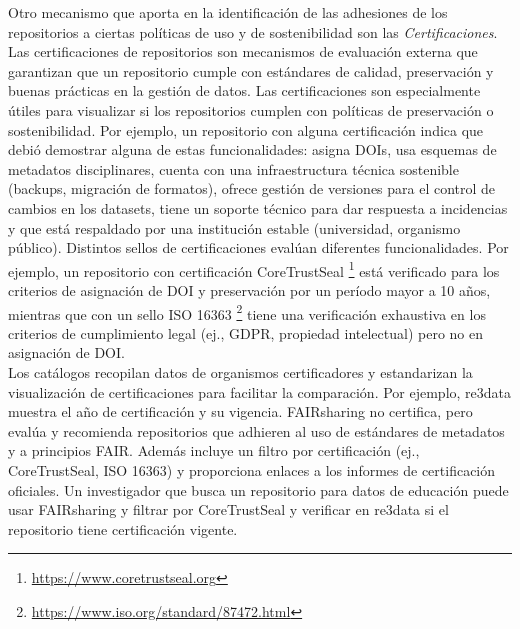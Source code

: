 \documentclass[runningheads]{llncs}
\begin{document}
Otro mecanismo que aporta en la identificación de las adhesiones de los repositorios a ciertas políticas de uso y de sostenibilidad son las \emph{Certificaciones}. Las certificaciones de repositorios son mecanismos de evaluación externa que garantizan que un repositorio cumple con estándares de calidad, preservación y buenas prácticas en la gestión de datos. Las certificaciones son especialmente útiles para visualizar si los repositorios cumplen con políticas de preservación o sostenibilidad. Por ejemplo, un repositorio con alguna certificación indica que debió demostrar alguna de estas funcionalidades: asigna DOIs, usa esquemas de metadatos disciplinares,  cuenta con una infraestructura técnica sostenible (backups, migración de formatos), ofrece gestión de versiones para el control de cambios en los datasets, tiene un soporte técnico para dar respuesta a incidencias y que está respaldado por una institución estable (universidad, organismo público). Distintos sellos de certificaciones evalúan diferentes funcionalidades. Por ejemplo, un repositorio con certificación CoreTrustSeal \footnote{\url{https://www.coretrustseal.org}} está verificado para los criterios de asignación de DOI y preservación por un período mayor a 10 años, mientras que con un sello ISO 16363 \footnote{\url{https://www.iso.org/standard/87472.html}} tiene una verificación exhaustiva en los criterios de cumplimiento legal (ej., GDPR, propiedad intelectual) pero no en asignación de DOI.\\


Los catálogos recopilan datos de organismos certificadores y estandarizan la visualización de certificaciones para facilitar la comparación. Por ejemplo, re3data muestra el año de certificación y su vigencia.  FAIRsharing no certifica, pero evalúa y recomienda repositorios que adhieren al uso de estándares de metadatos y a principios FAIR. Además incluye un filtro por certificación (ej., CoreTrustSeal, ISO 16363) y proporciona enlaces a los informes de certificación oficiales. Un investigador que busca un repositorio para datos de educación puede usar FAIRsharing y filtrar por CoreTrustSeal y verificar en re3data si el repositorio tiene certificación vigente.
\end{document}
